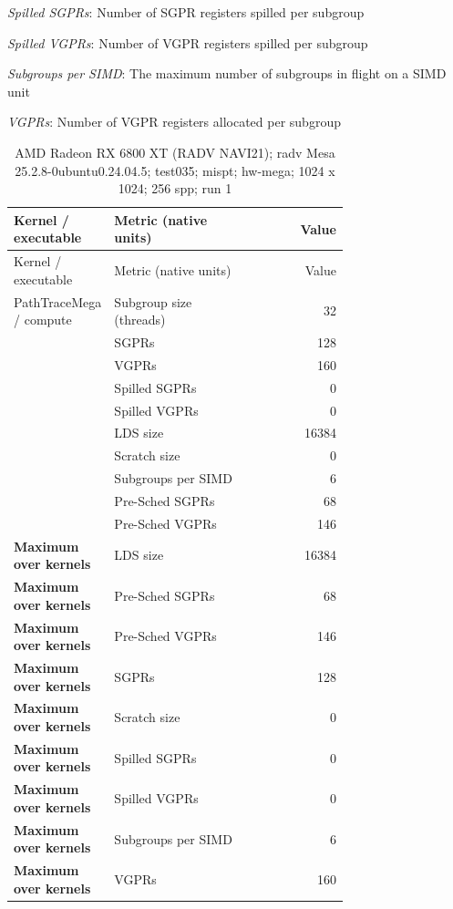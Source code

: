 \noindent\textit{Spilled SGPRs}: Number of SGPR registers spilled per subgroup\par
\noindent\textit{Spilled VGPRs}: Number of VGPR registers spilled per subgroup\par
\noindent\textit{Subgroups per SIMD}: The maximum number of subgroups in flight on a SIMD unit\par
\noindent\textit{VGPRs}: Number of VGPR registers allocated per subgroup\par
\begin{longtable}{p{0.30\linewidth}p{0.43\linewidth}r}
\caption{AMD Radeon RX 6800 XT (RADV NAVI21); radv Mesa 25.2.8-0ubuntu0.24.04.5; test035; mispt; hw-mega; 1024 x 1024; 256 spp; run 1}\label{tab:hydra-profile-21}\\
\hline Kernel / executable & Metric (native units) & Value \\\hline
\endfirsthead
\hline Kernel / executable & Metric (native units) & Value \\\hline
\endhead
PathTraceMega / compute & Subgroup size (threads) & 32 \\
 & SGPRs & 128 \\
 & VGPRs & 160 \\
 & Spilled SGPRs & 0 \\
 & Spilled VGPRs & 0 \\
 & LDS size & 16384 \\
 & Scratch size & 0 \\
 & Subgroups per SIMD & 6 \\
 & Pre-Sched SGPRs & 68 \\
 & Pre-Sched VGPRs & 146 \\
\hline
\textbf{Maximum over kernels} & LDS size & 16384 \\
\textbf{Maximum over kernels} & Pre-Sched SGPRs & 68 \\
\textbf{Maximum over kernels} & Pre-Sched VGPRs & 146 \\
\textbf{Maximum over kernels} & SGPRs & 128 \\
\textbf{Maximum over kernels} & Scratch size & 0 \\
\textbf{Maximum over kernels} & Spilled SGPRs & 0 \\
\textbf{Maximum over kernels} & Spilled VGPRs & 0 \\
\textbf{Maximum over kernels} & Subgroups per SIMD & 6 \\
\textbf{Maximum over kernels} & VGPRs & 160 \\
\hline
\end{longtable}
